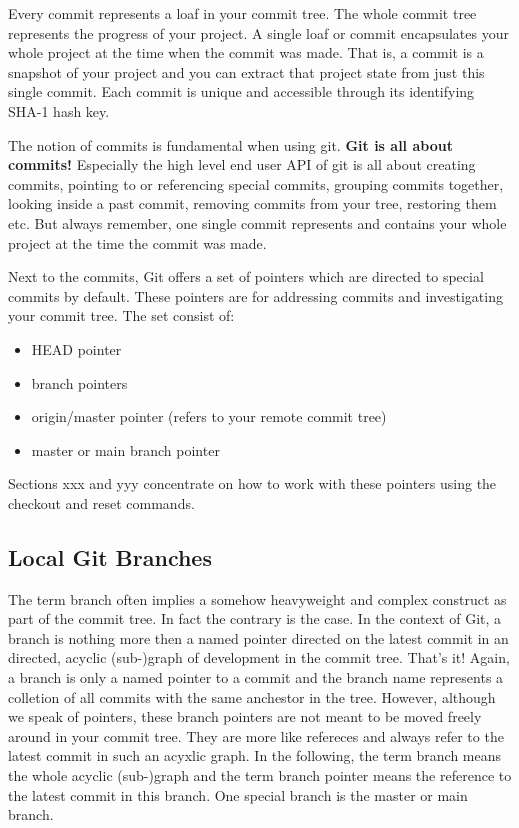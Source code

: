 Every commit represents a loaf in your commit tree. The whole commit tree represents the 
progress of your project. A single loaf or commit encapsulates 
your whole project at the time when the commit was made. That is, a commit is a snapshot 
of your project and you can extract that project state from just this single commit.
Each commit is unique and accessible through its identifying SHA-1 hash key.

The notion of commits is fundamental when using git. \textbf{Git is all about commits!} Especially the high level end user API of 
git is all about creating commits, pointing to or referencing special commits, grouping commits together,
looking inside a past commit, removing commits from your tree, restoring them etc.
But always remember, one single commit represents and contains your whole project at the time the commit 
was made.
   
Next to the commits, Git offers a set of pointers which are directed to special commits by default. These 
pointers are for addressing commits and investigating your commit tree. The set consist of:
\begin{itemize}
	\item HEAD pointer
	\item branch pointers
	\item origin/master pointer (refers to your remote commit tree)
	\item master or main branch pointer
\end{itemize}

Sections xxx and yyy concentrate on how to work with these pointers using the checkout and reset 
commands.


\subsection*{Local Git Branches}

The term branch often implies a somehow heavyweight and complex construct as part of the commit 
tree. In fact the contrary is the case. In the context of Git, a branch is nothing more then 
a named pointer directed on the latest commit in an directed, acyclic (sub-)graph of development
in the commit tree. That's it! Again, a branch is only a named pointer to a commit and the 
branch name represents a colletion of all commits with the same anchestor in the tree. However, although
we speak of pointers, these branch pointers are not meant to be moved freely around in your commit tree.
They are more like refereces and always refer to the latest commit in such an acyxlic graph.
In the following, the term branch means the whole acyclic (sub-)graph and the term branch pointer 
means the reference to the latest commit in this branch.
One special branch is the master or main branch.

